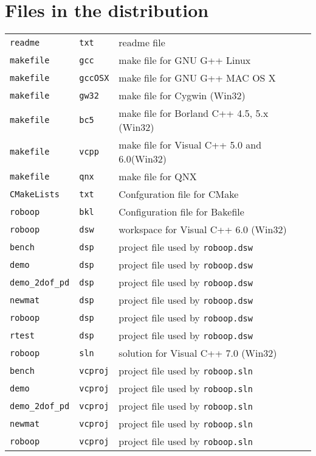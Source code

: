 \documentclass[dvips,11pt,fleqn]{report}
\begin{document}
\section{Files in the distribution}

{\small
\begin{tabular}{lll}
{\tt readme} & {\tt txt} & readme file \\
{\tt makefile} & {\tt gcc} & make file for GNU G++ Linux \\
{\tt makefile} & {\tt gccOSX} & make file for GNU G++ MAC OS X \\
{\tt makefile} & {\tt gw32} & make file for Cygwin (Win32)  \\
{\tt makefile} & {\tt bc5} & make file for Borland C++ 4.5, 5.x (Win32) \\
{\tt makefile} & {\tt vcpp} & make file for Visual C++ 5.0 and 6.0(Win32) \\
{\tt makefile} & {\tt qnx} & make file for QNX \\
{\tt CMakeLists} & {\tt txt} & Confguration file for CMake \\
{\tt roboop} & {\tt bkl} & Configuration file for Bakefile \\
{\tt roboop} & {\tt dsw} & workspace for Visual C++ 6.0 (Win32) \\
{\tt bench} & {\tt dsp} & project file used by \texttt{roboop.dsw} \\
{\tt demo} & {\tt dsp} & project file used by \texttt{roboop.dsw} \\
{\tt demo\_2dof\_pd} & {\tt dsp} & project file used by \texttt{roboop.dsw} \\
{\tt newmat} & {\tt dsp} & project file used by \texttt{roboop.dsw} \\
{\tt roboop} & {\tt dsp} & project file used by \texttt{roboop.dsw} \\
{\tt rtest} & {\tt dsp} & project file used by \texttt{roboop.dsw} \\
{\tt roboop} & {\tt sln} & solution for Visual C++ 7.0 (Win32) \\
{\tt bench} & {\tt vcproj} & project file used by \texttt{roboop.sln} \\
{\tt demo} & {\tt vcproj} & project file used by \texttt{roboop.sln} \\
{\tt demo\_2dof\_pd} & {\tt vcproj} & project file used by \texttt{roboop.sln} \\
{\tt newmat} & {\tt vcproj} & project file used by \texttt{roboop.sln} \\
{\tt roboop} & {\tt vcproj} & project file used by \texttt{roboop.sln} \\

\end{tabular}}
\end{document}
